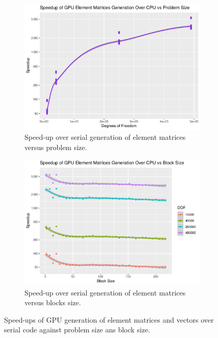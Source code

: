 \begin{figure}
	\centering
	\begin{subfigure}{0.48\linewidth}
		\centering
		\includegraphics[width = \linewidth]{Plots/elem_mats_dev_cpu_speedup_vs_n}
		\caption{Speed-up over serial generation of element matrices versus problem size.}
		\label{fig:elems_n}
	\end{subfigure}\hfill
	\begin{subfigure}{0.48\linewidth}
		\centering
		\includegraphics[width=\linewidth]{Plots/elem_mats_dev_cpu_speedup_vs_b}
		\caption{Speed-up over serial generation of element matrices versus blocks size.}
		\label{fig:elems_b}
	\end{subfigure}
	\caption{Speed-ups of GPU generation of element matrices and vectors over serial code against problem size ans block size.}
	\label{fig:elem_mats_gen}
\end{figure}

